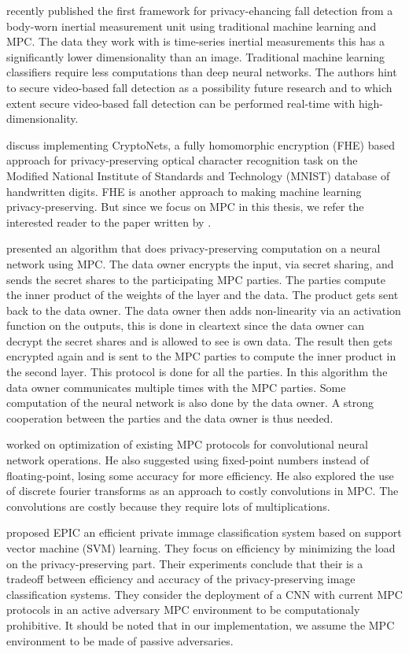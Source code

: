\cite{mainali2019privacy} recently published the first framework for privacy-ehancing fall detection from a body-worn inertial measurement unit using traditional machine learning and MPC. The data they work with is time-series inertial measurements this has a significantly lower dimensionality than an image. Traditional machine learning classifiers require less computations than deep neural networks. The authors hint to secure video-based fall detection as a possibility future research and to which extent secure video-based fall detection can be performed real-time with high-dimensionality.

\cite{gilad2016cryptonets} discuss implementing CryptoNets, a fully homomorphic encryption (FHE) based approach for privacy-preserving optical character recognition task on the Modified National Institute of Standards and Technology (MNIST) database of handwritten digits. FHE is another approach to making machine learning privacy-preserving. But since we focus on MPC in this thesis, we refer the interested reader to the paper written by \cite{gentry2009fully}.

\cite{barni2006privacy} presented an algorithm that does privacy-preserving computation on a neural network using MPC. The data owner encrypts the input, via secret sharing, and sends the secret shares to the participating MPC parties. The parties compute the inner product of the weights of the layer and the data. The product gets sent back to the data owner. The data owner then adds non-linearity via an activation function on the outputs, this is done in cleartext since the data owner can decrypt the secret shares and is allowed to see is own data. The result then gets encrypted again and is sent to the MPC parties to compute the inner product in the second layer. This protocol is done for all the parties. In this algorithm the data owner communicates multiple times with the MPC parties. Some computation of the neural network is also done by the data owner. A strong cooperation between the parties and the data owner is thus needed.

\cite{campmans2018optimizing} worked on optimization of existing MPC protocols for convolutional neural network operations. He also suggested using fixed-point numbers instead of floating-point, losing some accuracy for more efficiency. He also explored the use of discrete fourier transforms as an approach to costly convolutions in MPC. The convolutions are costly because they require lots of multiplications.

\cite{makri2019epic} proposed EPIC an efficient private immage classification system based on support vector machine (SVM) learning. They focus on efficiency by minimizing the load on the privacy-preserving part. Their experiments conclude that their is a tradeoff between efficiency and accuracy of the privacy-preserving image classification systems. They consider the deployment of a CNN with current MPC protocols in an active adversary MPC environment to be computationaly prohibitive. It should be noted that in our implementation, we assume the MPC environment to be made of passive adversaries.

